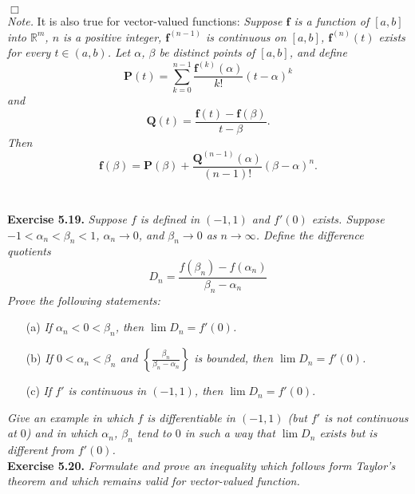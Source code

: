 \documentclass{article}
\begin{document}
$\Box$ \\

\emph{Note.}
It is also true for vector-valued functions:
  \emph{Suppose $\mathbf{f}$ is a function of $[a,b]$ into $\mathbb{R}^{m}$,
  $n$ is a positive integer,
  $\mathbf{f}^{(n-1)}$ is continuous on $[a,b]$,
  $\mathbf{f}^{(n)}(t)$ exists for every $t \in (a,b)$.
  Let $\alpha$, $\beta$ be distinct points of $[a,b]$, and define
  \[
    \mathbf{P}(t) = \sum_{k=0}^{n-1} \frac{\mathbf{f}^{(k)}(\alpha)}{k!}(t - \alpha)^k
  \]
  and
  \[
    \mathbf{Q}(t) = \frac{\mathbf{f}(t) - \mathbf{f}(\beta)}{t - \beta}.
  \]
  Then
  \[
    \mathbf{f}(\beta) = \mathbf{P}(\beta)
      + \frac{\mathbf{Q}^{(n-1)}(\alpha)}{(n-1)!} (\beta - \alpha)^n.
  \]} \\\\






\textbf{Exercise 5.19.}
\emph{Suppose $f$ is defined in $(-1,1)$ and $f'(0)$ exists.
Suppose $-1 < \alpha_n < \beta_n < 1$, $\alpha_n \rightarrow 0$,
and $\beta_n \rightarrow 0$ as $n \rightarrow \infty$.
Define the difference quotients
\[
  D_n = \frac{f(\beta_n) - f(\alpha_n)}{\beta_n - \alpha_n}
\]
Prove the following statements:}
\begin{enumerate}
  \item[(a)]
  \emph{If $\alpha_n < 0 < \beta_n$, then $\lim{D_n} = f'(0)$.}

  \item[(b)]
  \emph{If $0 < \alpha_n < \beta_n$ and $\left\{\frac{\beta_n}{\beta_n-\alpha_n}\right\}$ is bounded,
  then $\lim{D_n} = f'(0)$.}

  \item[(c)]
  \emph{If $f'$ is continuous in $(-1,1)$, then $\lim{D_n} = f'(0)$}.
\end{enumerate}
\emph{Give an example in which $f$ is differentiable in $(-1,1)$
(but $f'$ is not continuous at $0$) and in which
$\alpha_n$, $\beta_n$ tend to $0$ in such a way that $\lim{D_n}$ exists
but is different from $f'(0)$.} \\






\textbf{Exercise 5.20.}
\emph{Formulate and prove an inequality which follows form Taylor's theorem and
which remains valid for vector-valued function.} \\
\end{document}
